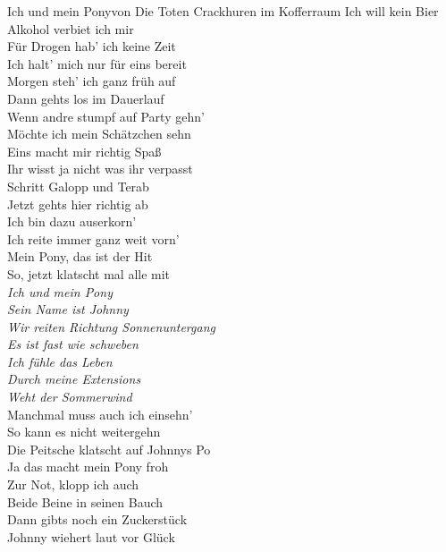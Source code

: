 
\begin{lied*}{Ich und mein Pony}{von Die Toten Crackhuren im Kofferraum}
Ich will kein Bier\\
Alkohol verbiet ich mir\\
Für Drogen hab’ ich keine Zeit\\
Ich halt’ mich nur für eins bereit\\

Morgen steh’ ich ganz früh auf\\
Dann gehts los im Dauerlauf\\
Wenn andre stumpf auf Party gehn’\\
Möchte ich mein Schätzchen sehn\\

Eins macht mir richtig Spaß\\
Ihr wisst ja nicht was ihr verpasst\\
Schritt Galopp und Terab\\
Jetzt gehts hier richtig ab\\

Ich bin dazu auserkorn’\\
Ich reite immer ganz weit vorn’\\
Mein Pony, das ist der Hit\\
So, jetzt klatscht mal alle mit\\

\textit{Ich und mein Pony\\
Sein Name ist Johnny\\
Wir reiten Richtung Sonnenuntergang\\
Es ist fast wie schweben\\
Ich fühle das Leben\\
Durch meine Extensions\\
Weht der Sommerwind}\\

Manchmal muss auch ich einsehn’\\
So kann es nicht weitergehn\\
Die Peitsche klatscht auf Johnnys Po\\
Ja das macht mein Pony froh\\

Zur Not, klopp ich auch\\
Beide Beine in seinen Bauch\\
Dann gibts noch ein Zuckerstück\\
Johnny wiehert laut vor Glück\\


\end{lied*}

